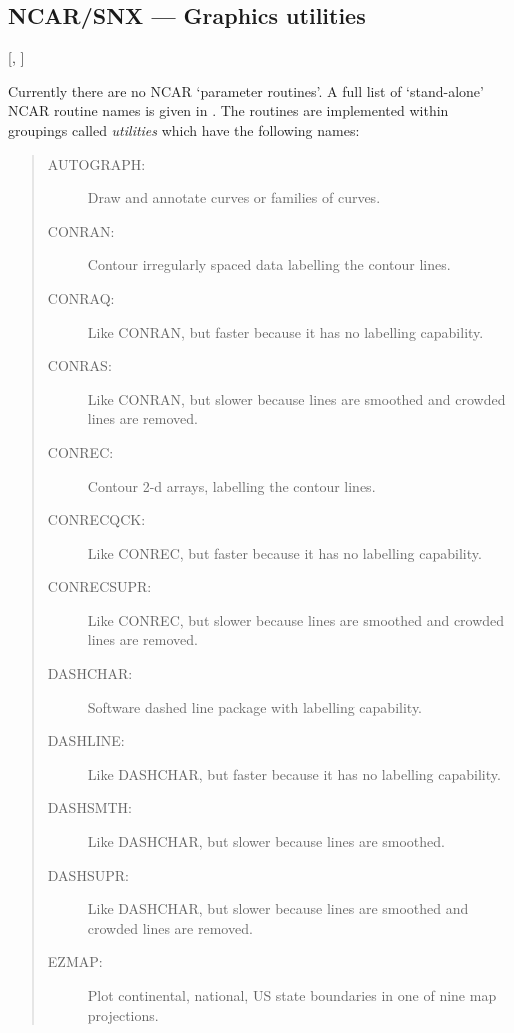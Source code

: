 \subsection{NCAR/SNX --- Graphics utilities}

\vspace{-9mm}

\hfill [, ]

\vspace{2mm}

Currently there are no NCAR `parameter routines'.
A full list of `stand-alone' NCAR routine names is given in
.
The routines are implemented within groupings called {\em utilities} which
have the following names:

\begin{quote}
\begin{description}
\item [AUTOGRAPH:] 
 Draw and annotate curves or families of curves.
\\
\item [CONRAN:] 
 Contour irregularly spaced data labelling the contour lines.
\item [CONRAQ:] 
 Like CONRAN, but faster because it has no labelling capability.
\item [CONRAS:] 
 Like CONRAN, but slower because lines are smoothed and crowded lines are
 removed.
\\
\item [CONREC:] 
 Contour 2-d arrays, labelling the contour lines.
\item [CONRECQCK:] 
 Like CONREC, but faster because it has no labelling capability.
\item [CONRECSUPR:] 
 Like CONREC, but slower because lines are smoothed and crowded lines are
 removed.
\\
\item [DASHCHAR:] 
 Software dashed line package with labelling capability.
\item [DASHLINE:] 
 Like DASHCHAR, but faster because it has no labelling capability.
\item [DASHSMTH:] 
 Like DASHCHAR, but slower because lines are smoothed.
\item [DASHSUPR:] 
 Like DASHCHAR, but slower because lines are smoothed and crowded lines are
 removed.
\\
\item [EZMAP:] 
 Plot continental, national, US state boundaries in one of nine map
 projections.

\end{description}
\end{quote}
